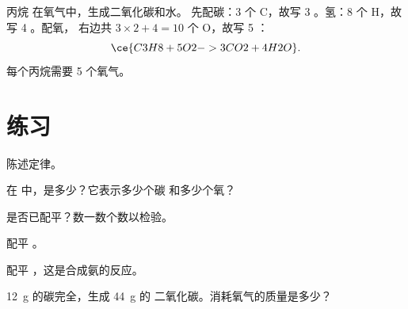 \begin{example}[露营炉中的丙烷]\label{ex:g8:balanced-equations:propane}
丙烷  在氧气中，生成二氧化碳和水。
先配碳：3 个 C，故写 3 。氢：8 个 H，故写 4 。配氧，
右边共 $3 \times 2 + 4 = 10$ 个 O，故写 5 ：
\[
  \ce{C3H8 + 5O2 -> 3CO2 + 4H2O}.
\]
每个丙烷需要 5 个氧气。
\end{example}

\section{练习}

\begin{exercise}[$\star$]\label{exo:g8:balanced-equations:1}
陈述定律。
\end{exercise}

\begin{exercise}[$\star$]\label{exo:g8:balanced-equations:2}
在  中，是多少？它表示多少个碳
和多少个氧？
\end{exercise}

\begin{exercise}[$\star$]\label{exo:g8:balanced-equations:3}
 是否已配平？数一数个数以检验。
\end{exercise}

\begin{exercise}[$\star$]\label{exo:g8:balanced-equations:4}
配平 。 %
\end{exercise}

\begin{exercise}[$\star\star$]\label{exo:g8:balanced-equations:5}
配平 ，这是合成氨的反应。 %
\end{exercise}

\begin{exercise}[$\star\star$]\label{exo:g8:balanced-equations:6}
\qty{12}{g} 的碳完全，生成 \qty{44}{g} 的
二氧化碳。消耗氧气的质量是多少？
\end{exercise}

